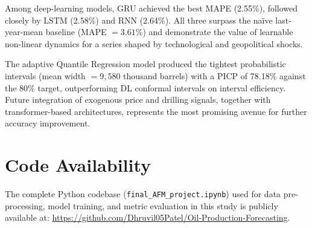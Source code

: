\documentclass[12pt,a4paper]{article}
\begin{document}
Among deep-learning models, GRU achieved the best MAPE (2.55\%), followed closely by LSTM (2.58\%) and RNN (2.64\%). All three surpass the na\"ive last-year-mean baseline (MAPE $= 3.61\%$) and demonstrate the value of learnable non-linear dynamics for a series shaped by technological and geopolitical shocks.

The adaptive Quantile Regression model produced the tightest probabilistic intervals (mean width $= 9{,}580$ thousand barrels) with a PICP of 78.18\% against the 80\% target, outperforming DL conformal intervals on interval efficiency. Future integration of exogenous price and drilling signals, together with transformer-based architectures, represents the most promising avenue for further accuracy improvement.

\section*{Code Availability}
The complete Python codebase (\texttt{final\_AFM\_project.ipynb}) used for data pre-processing, model training, and metric evaluation in this study is publicly available at: \url{https://github.com/Dhruvil05Patel/Oil-Production-Forecasting}.

\end{document}
